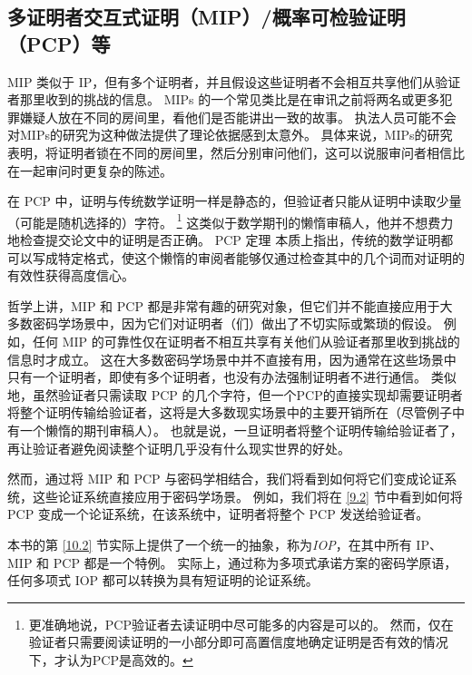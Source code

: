 \subsection{多证明者交互式证明（MIP）/概率可检验证明（PCP）等} \label{1.2.3}
MIP 类似于 IP，但有多个证明者，并且假设这些证明者不会相互共享他们从验证者那里收到的挑战的信息。 MIPs 的一个常见类比是在审讯之前将两名或更多犯罪嫌疑人放在不同的房间里，看他们是否能讲出一致的故事。 
执法人员可能不会对MIPs的研究为这种做法提供了理论依据感到太意外。
具体来说，MIPs的研究表明，将证明者锁在不同的房间里，然后分别审问他们，这可以说服审问者相信比在一起审问时更复杂的陈述。


在 PCP 中，证明与传统数学证明一样是静态的，但验证者只能从证明中读取少量（可能是随机选择的）字符。 
\footnote{更准确地说，PCP验证者去读证明中尽可能多的内容是可以的。 然而，仅在验证者只需要阅读证明的一小部分即可高置信度地确定证明是否有效的情况下，才认为PCP是高效的。} 
这类似于数学期刊的懒惰审稿人，他并不想费力地检查提交论文中的证明是否正确。 
PCP 定理 \cite{ALM+98,AS98}本质上指出，传统的数学证明都可以写成特定格式，使这个懒惰的审阅者能够仅通过检查其中的几个词而对证明的有效性获得高度信心。

哲学上讲，MIP 和 PCP 都是非常有趣的研究对象，但它们并不能直接应用于大多数密码学场景中，因为它们对证明者（们）做出了不切实际或繁琐的假设。 
例如，任何 MIP 的可靠性仅在证明者不相互共享有关他们从验证者那里收到挑战的信息时才成立。 这在大多数密码学场景中并不直接有用，因为通常在这些场景中只有一个证明者，即使有多个证明者，也没有办法强制证明者不进行通信。 
类似地，虽然验证者只需读取 PCP 的几个字符，但一个PCP的直接实现却需要证明者将整个证明传输给验证者，这将是大多数现实场景中的主要开销所在（尽管例子中有一个懒惰的期刊审稿人）。 也就是说，一旦证明者将整个证明传输给验证者了，再让验证者避免阅读整个证明几乎没有什么现实世界的好处。

然而，通过将 MIP 和 PCP 与密码学相结合，我们将看到如何将它们变成论证系统，这些论证系统直接应用于密码学场景。 例如，我们将在 \ref{9.2} 节中看到如何将 PCP 变成一个论证系统，在该系统中，证明者将整个 PCP 发送给验证者。

本书的第 \ref{10.2} 节实际上提供了一个统一的抽象，称为\emph{IOP}，在其中所有 IP、MIP 和 PCP 都是一个特例。 实际上，通过称为多项式承诺方案的密码学原语，任何多项式 IOP 都可以转换为具有短证明的论证系统。
